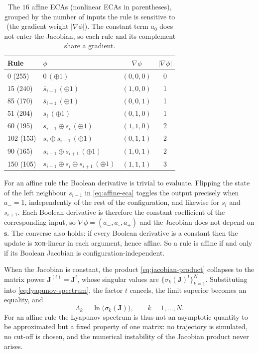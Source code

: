 \documentclass[a4paper,fleqn]{cas-dc}
\begin{document}
\begin{table}[t]
\centering
\caption{The $16$ affine ECAs (nonlinear ECAs in parentheses), grouped by the number of inputs the rule is sensitive to (the gradient weight $\lvert\nabla\phi\rvert$). The constant term $a_0$ does not enter the Jacobian, so each rule and its complement share a gradient.}
\label{tab:affine-ecas}
\begin{tabular*}{\tblwidth}{@{} p{2cm} p{3.2cm} c c @{}}
\toprule
\textbf{Rule} & $\phi$ & $\nabla\phi$ & $\lvert\nabla\phi\rvert$\\
\midrule
0 (255)   & $0\,(\oplus 1)$                                 & $(0,0,0)$ & 0\\
15 (240)  & $\bar{s}_{i-1}\,(\oplus 1)$                     & $(1,0,0)$ & 1\\
85 (170)  & $\bar{s}_{i+1}\,(\oplus 1)$                     & $(0,0,1)$ & 1\\
51 (204)  & $\bar{s}_i\,(\oplus 1)$                         & $(0,1,0)$ & 1\\
60 (195)  & $s_{i-1}\oplus s_i\,(\oplus 1)$                 & $(1,1,0)$ & 2\\
102 (153) & $s_i\oplus s_{i+1}\,(\oplus 1)$                 & $(0,1,1)$ & 2\\
90 (165)  & $s_{i-1}\oplus s_{i+1}\,(\oplus 1)$             & $(1,0,1)$ & 2\\
150 (105) & $s_{i-1}\oplus s_i\oplus s_{i+1}\,(\oplus 1)$   & $(1,1,1)$ & 3\\
\bottomrule
\end{tabular*}
\end{table}

For an affine rule the Boolean derivative is trivial to evaluate. Flipping the state of the left neighbour $s_{i-1}$ in \eqref{eq:affine-eca} toggles the output precisely when $a_-=1$, independently of the rest of the configuration, and likewise for $s_i$ and $s_{i+1}$. Each Boolean derivative is therefore the constant coefficient of the corresponding input, so $\nabla\phi=(a_-,a_\circ,a_+)$ and the Jacobian does not depend on $\mathbf{s}$. The converse also holds: if every Boolean derivative is a constant then the update is \textsc{xor}-linear in each argument, hence affine. So a rule is affine if and only if its Boolean Jacobian is configuration-independent.

When the Jacobian is constant, the product \eqref{eq:jacobian-product} collapses
to the matrix power $\mathbf{J}^{(t)}=\mathbf{J}^t$, whose singular values are
$\{\sigma_k(\mathbf{J})^t\}_{k=1}^N$. Substituting into \eqref{eq:lyapunov-spectrum}, the
factor $t$ cancels, the limit superior becomes an equality, and
\begin{equation}
    \label{eq:exact-spectrum}
    \Lambda_k=\ln\bigl(\sigma_k(\mathbf{J})\bigr),\qquad k=1,\dots,N.
\end{equation}
For an affine rule the Lyapunov spectrum is thus not an asymptotic
quantity to be approximated but a fixed property of one matrix: no trajectory is
simulated, no cut-off is chosen, and the numerical instability of the Jacobian
product never arises.
\end{document}

